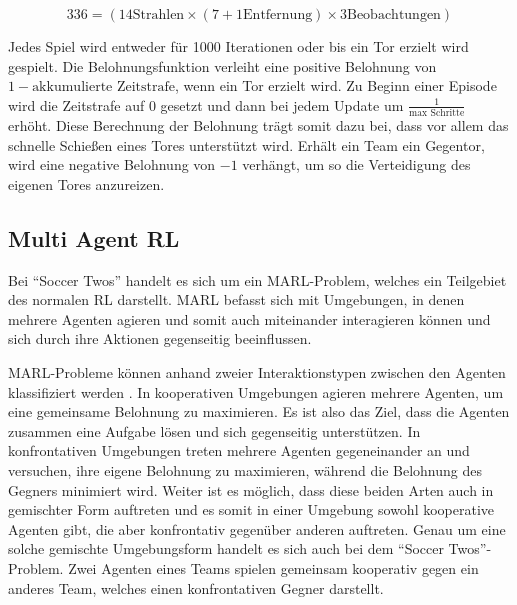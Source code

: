 \documentclass[twocolumn]{webofc}
\begin{document}
\[
336 = (14 \text{Strahlen} \times (7 + 1 \text{Entfernung}) \times 3 \text{Beobachtungen})
\]

Jedes Spiel wird entweder für 1000 Iterationen oder bis ein Tor erzielt wird gespielt. Die Belohnungsfunktion verleiht eine positive Belohnung von \(1 - \text{akkumulierte Zeitstrafe}\), wenn ein Tor erzielt wird. Zu Beginn einer Episode wird die Zeitstrafe auf \(0\) gesetzt und dann bei jedem Update um \( \frac{1}{\text{max Schritte}} \) erhöht. Diese Berechnung der Belohnung trägt somit dazu bei, dass vor allem das schnelle Schießen eines Tores unterstützt wird.  Erhält ein Team ein Gegentor, wird eine negative Belohnung von \(-1\) verhängt, um so die Verteidigung des eigenen Tores anzureizen.

\subsection{Multi Agent \acl{RL}}

Bei \enquote{Soccer Twos} handelt es sich um ein \ac{MARL}-Problem, welches ein Teilgebiet des normalen \ac{RL} darstellt. \ac{MARL} befasst sich mit Umgebungen, in denen mehrere Agenten agieren und somit auch miteinander interagieren können und sich durch ihre Aktionen gegenseitig beeinflussen.

\ac{MARL}-Probleme können anhand zweier Interaktionstypen zwischen den Agenten klassifiziert werden \cite{10.1007/11691839_1}. In kooperativen Umgebungen agieren mehrere Agenten, um eine gemeinsame Belohnung zu maximieren. Es ist also das Ziel, dass die Agenten zusammen eine Aufgabe lösen und sich gegenseitig unterstützen. In konfrontativen Umgebungen treten mehrere Agenten gegeneinander an und versuchen, ihre eigene Belohnung zu maximieren, während die Belohnung des Gegners minimiert wird.
Weiter ist es möglich, dass diese beiden Arten auch in gemischter Form auftreten und es somit in einer Umgebung sowohl kooperative Agenten gibt, die aber konfrontativ gegenüber anderen auftreten. Genau um eine solche gemischte Umgebungsform handelt es sich auch bei dem \enquote{Soccer Twos}-Problem. Zwei Agenten eines Teams spielen gemeinsam kooperativ gegen ein anderes Team, welches einen konfrontativen Gegner darstellt.
\end{document}

